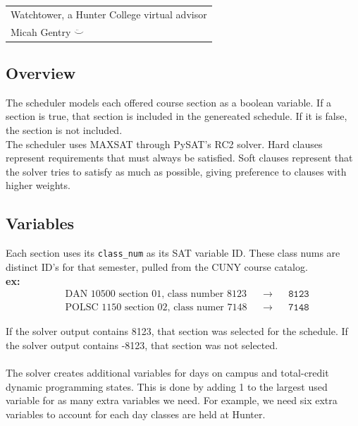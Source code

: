 \documentclass[11pt, a4paper]{article} %
\newcommand{\<}{\langle}
\renewcommand{\>}{\rangle}
\begin{document}
	
\setlength{\parindent}{0pt} %
\onehalfspacing				%

\begin{tabular}{p{15.5cm}}
    Watchtower, a Hunter College virtual advisor\\
	Micah Gentry $\ddot\smile$ \\
        \hline
\end{tabular}

\subsection*{Overview}
The scheduler models each offered course section as a boolean variable. If a section is true, that section is included in the genereated schedule. If it is false, the section is not included.\\
The scheduler uses MAXSAT through PySAT's RC2 solver. Hard clauses represent requirements that must always be satisfied. Soft clauses represent that the solver tries to satisfy as much as possible, giving preference to clauses with higher weights.
\subsection*{Variables}
Each section uses its \texttt{class\_num} as its SAT variable ID. These class nums are distinct ID's for that semester, pulled from the CUNY course catalog.\\
\textbf{ex:} 
\vspace{-4mm}
\begin{align*}
  &\text{DAN 10500 section 01, class number 8123} &&\rightarrow &&\texttt{8123}\\
  &\text{POLSC 1150 section 02, class numer 7148} &&\rightarrow &&\texttt{7148}
\end{align*}

If the solver output contains 8123, that section was selected for the schedule. If the solver output contains -8123, that section was not selected.\\
\\
The solver creates additional variables for days on campus and total-credit dynamic programming states. This is done by adding 1 to the largest used variable for as many extra variables we need. For example, we need six extra variables to account for each day classes are held at Hunter.
\end{document}
